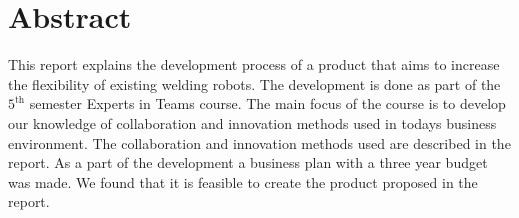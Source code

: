 \section{Abstract}
This report explains the development process of a product that aims to increase the flexibility of existing welding robots. The development is done as part of the \(5^{\text{th}}\) semester Experts in Teams course. The main focus of the course is to develop our knowledge of collaboration and innovation methods used in todays business environment. The collaboration and innovation methods used are described in the report. As a part of the development a business plan with a three year budget was made. We found that it is feasible to create the product proposed in the report.